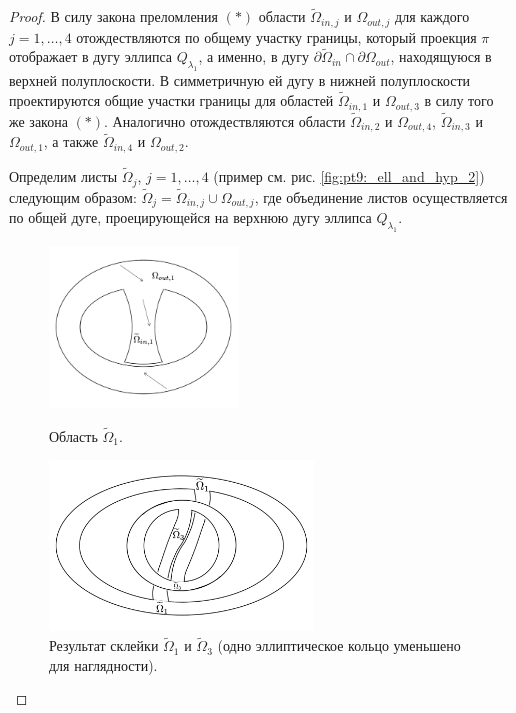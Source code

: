 \begin{proof}
В силу закона преломления $(\ast)$ области $\widetilde{\Omega}_{in, j}$ и $\Omega_{out, j}$ для каждого $j=1,\ldots, 4$ отождествляются по общему участку границы, который проекция $\pi$ отображает в дугу эллипса $Q_{\lambda_1}$, а именно, в дугу $\partial \widetilde{\Omega}_{in} \cap \partial \Omega_{out}$, находящуюся в верхней полуплоскости.
В симметричную ей дугу в нижней полуплоскости проектируются общие участки границы для областей $\widetilde{\Omega}_{in, 1}$ и $\Omega_{out, 3}$ в силу того же закона $(\ast)$. Аналогично отождествляются области $\widetilde{\Omega}_{in, 2}$ и $\Omega_{out, 4}$, $\widetilde{\Omega}_{in, 3}$ и $\Omega_{out, 1}$, а также $\widetilde{\Omega}_{in, 4}$ и $\Omega_{out, 2}$.

Определим листы $\widetilde{\Omega}_j$, $j=1, \ldots, 4$ (пример см. рис. \ref{fig:pt9:_ell_and_hyp_2}) следующим образом: 
$\widetilde{\Omega}_j = \widetilde{\Omega}_{in, j} \cup \Omega_{out, j}$, где объединение листов осуществляется по общей дуге, проецирующейся на верхнюю дугу эллипса $Q_{\lambda_1}$.

\begin{figure}[!htb]
\centering
\includegraphics[width=5cm]{images/ch4/section2/ell_and_hyp2.pdf}
    \caption{Область $\widetilde{\Omega}_1$.}
    \label{fig:pt9:_ell_and_hyp_2}
\endminipage\hfill
{}
\centering
\includegraphics[width=7cm]{images/ch4/section2/ell_and_hyp2_permutations.pdf}
    \caption{Результат склейки $\widetilde{\Omega}_1$ и $\widetilde{\Omega}_3$ (одно эллиптическое кольцо уменьшено для наглядности).}
    \label{fig:pt9:_ell_and_hyp2_permutations}
\endminipage\hfill
\end{figure}


\end{proof}

